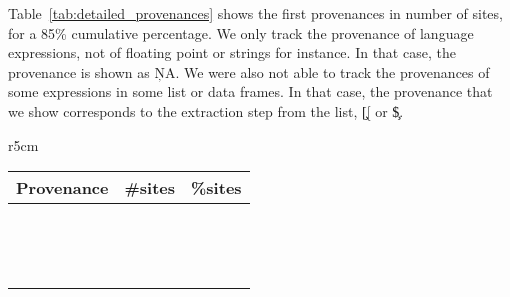 \documentclass[review,screen,acmsmall]{acmart}
\begin{document}
 Table~\ref{tab:detailed_provenances} shows the first provenances in number of sites, for a 85\% cumulative percentage. We only track the provenance of language expressions, not of floating point or strings for instance. In that case, the provenance is shown as \c{NA}. We were also not able to track the provenances of some expressions in some list or data frames. In that case, the provenance that we show corresponds to the extraction step from the list, \ie \c{[[} or \c{\$}.

\begin{wraptable}{r}{5cm}\small\centering
	\begin{tabular}{|c|c|c|}
		\hline
		Provenance & \#sites & \%sites \\
		\hline
		\packageProvenanceNamea & \packageNbProvenanceSitesa & \packagePercentProvenanceSitesa \\
		\packageProvenanceNameb & \packageNbProvenanceSitesb & \packagePercentProvenanceSitesb \\
		\packageProvenanceNamec & \packageNbProvenanceSitesc & \packagePercentProvenanceSitesc \\
		\packageProvenanceNamed & \packageNbProvenanceSitesd & \packagePercentProvenanceSitesd \\
		\packageProvenanceNamee & \packageNbProvenanceSitese & \packagePercentProvenanceSitese \\
		\packageProvenanceNamef & \packageNbProvenanceSitesf & \packagePercentProvenanceSitesf \\
		\packageProvenanceNameg & \packageNbProvenanceSitesg & \packagePercentProvenanceSitesg \\
		\packageProvenanceNameh & \packageNbProvenanceSitesh & \packagePercentProvenanceSitesh \\
		\packageProvenanceNamei & \packageNbProvenanceSitesi & \packagePercentProvenanceSitesi \\
		\packageProvenanceNamej & \packageNbProvenanceSitesj & \packagePercentProvenanceSitesj \\
		\packageProvenanceNamek & \packageNbProvenanceSitesk & \packagePercentProvenanceSitesk \\
		\packageProvenanceNamel & \packageNbProvenanceSitesl & \packagePercentProvenanceSitesl \\
		\packageProvenanceNamem & \packageNbProvenanceSitesm & \packagePercentProvenanceSitesm \\
		\packageProvenanceNamen & \packageNbProvenanceSitesn & \packagePercentProvenanceSitesn \\
		\hline
	\end{tabular}
	\caption{Provenances in number of sites (85\% first sites).} \label{tab:detailed_provenances}
\end{wraptable}
\end{document}

